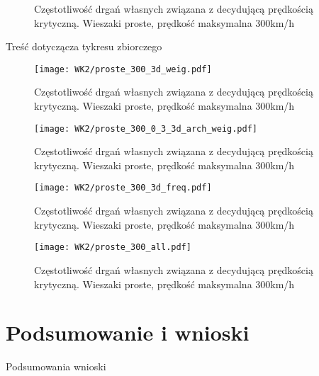 \begin{figure}[h]
	\centering
	\captionsetup{justification=centering}
	\caption{Częstotliwość drgań własnych związana z decydującą prędkością krytyczną. Wieszaki proste, prędkość maksymalna 300km/h}
\end{figure}
Treść dotyczącza tykresu zbiorczego 
\begin{figure}[h]
	\centering
	\texttt{[image: WK2/proste\_300\_3d\_weig.pdf]}
	\captionsetup{justification=centering}
	\caption{Częstotliwość drgań własnych związana z decydującą prędkością krytyczną. Wieszaki proste, prędkość maksymalna 300km/h}
\end{figure}
\begin{figure}[h]
	\centering
	\texttt{[image: WK2/proste\_300\_0\_3\_3d\_arch\_weig.pdf]}
	\captionsetup{justification=centering}
	\caption{Częstotliwość drgań własnych związana z decydującą prędkością krytyczną. Wieszaki proste, prędkość maksymalna 300km/h}
\end{figure}
\begin{figure}[h]
	\centering
	\texttt{[image: WK2/proste\_300\_3d\_freq.pdf]}
	\captionsetup{justification=centering}
	\caption{Częstotliwość drgań własnych związana z decydującą prędkością krytyczną. Wieszaki proste, prędkość maksymalna 300km/h}
\end{figure}
\begin{figure}[h]
	\centering
	\texttt{[image: WK2/proste\_300\_all.pdf]}
	\captionsetup{justification=centering}
	\caption{Częstotliwość drgań własnych związana z decydującą prędkością krytyczną. Wieszaki proste, prędkość maksymalna 300km/h}
\end{figure}



\chapter{Podsumowanie i wnioski}
Podsumowania wnioski